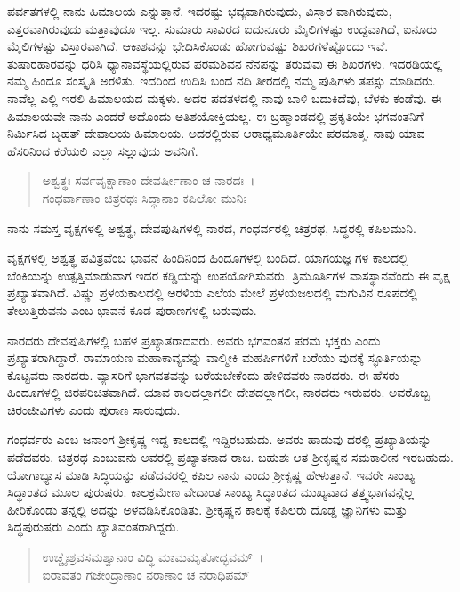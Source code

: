 ಪರ್ವತಗಳಲ್ಲಿ ನಾನು ಹಿಮಾಲಯ ಎನ್ನುತ್ತಾನೆ. ಇದರಷ್ಟು ಭವ್ಯವಾಗಿರುವುದು, ವಿಸ್ತಾರ ವಾಗಿರುವುದು, ಎತ್ತರವಾಗಿರುವುದು ಮತ್ತಾವುದೂ ಇಲ್ಲ. ಸುಮಾರು ಸಾವಿರದ ಐದುನೂರು ಮೈಲಿಗಳಷ್ಟು ಉದ್ದವಾಗಿದೆ, ಐನೂರು ಮೈಲಿಗಳಷ್ಟು ವಿಸ್ತಾರವಾಗಿದೆ. ಆಕಾಶವನ್ನು ಭೇದಿಸಿಕೊಂಡು ಹೋಗುವಷ್ಟು ಶಿಖರಗಳೆಷ್ಟೊಂದು ಇವೆ. ತುಷಾರಹಾರವನ್ನು ಧರಿಸಿ ಧ್ಯಾನಾವಸ್ಥೆಯಲ್ಲಿರುವ ಪರಮಶಿವನ ನೆನಪನ್ನು ತರುವುವು ಈ ಶಿಖರಗಳು. ಇದರಡಿಯಲ್ಲಿ ನಮ್ಮ ಹಿಂದೂ ಸಂಸ್ಕೃತಿ ಅರಳಿತು. ಇದರಿಂದ ಉದಿಸಿ ಬಂದ ನದಿ ತೀರದಲ್ಲಿ ನಮ್ಮ ಪುಷಿಗಳು ತಪಸ್ಸು ಮಾಡಿದರು. ನಾವೆಲ್ಲ ಎಲ್ಲಿ ಇರಲಿ ಹಿಮಾಲಯದ ಮಕ್ಕಳು. ಅದರ ಪದತಳದಲ್ಲಿ ನಾವು ಬಾಳಿ ಬದುಕಿದೆವು, ಬೆಳಕು ಕಂಡೆವು. ಈ ಹಿಮಾಲಯವೇ ನಾನು ಎಂದರೆ ಅದೊಂದು ಅತಿಶಯೋಕ್ತಿಯಲ್ಲ. ಈ ಬ್ರಹ್ಮಾಂಡದಲ್ಲಿ ಪ್ರಕೃತಿಯೇ ಭಗವಂತನಿಗೆ ನಿರ್ಮಿಸಿದ ಬೃಹತ್ ದೇವಾಲಯ ಹಿಮಾಲಯ. ಅದರಲ್ಲಿರುವ ಆರಾಧ್ಯಮೂರ್ತಿಯೇ ಪರಮಾತ್ಮ. ನಾವು ಯಾವ ಹೆಸರಿನಿಂದ ಕರೆಯಲಿ ಎಲ್ಲಾ ಸಲ್ಲುವುದು ಅವನಿಗೆ.

\begin{verse}
ಅಶ್ವತ್ಥಃ ಸರ್ವವೃಕ್ಷಾಣಾಂ ದೇವರ್ಷೀಣಾಂ ಚ ನಾರದಃ~।\\ಗಂಧರ್ವಾಣಾಂ ಚಿತ್ರರಥಃ ಸಿದ್ಧಾನಾಂ ಕಪಿಲೋ ಮುನಿಃ 
\end{verse}

{\small ನಾನು ಸಮಸ್ತ ವೃಕ್ಷಗಳಲ್ಲಿ ಅಶ್ವತ್ಥ, ದೇವಪುಷಿಗಳಲ್ಲಿ ನಾರದ, ಗಂಧರ್ವರಲ್ಲಿ ಚಿತ್ರರಥ, ಸಿದ್ಧರಲ್ಲಿ ಕಪಿಲಮುನಿ.}

ವೃಕ್ಷಗಳಲ್ಲಿ ಅಶ್ವತ್ಥ ಪವಿತ್ರವೆಂಬ ಭಾವನೆ ಹಿಂದಿನಿಂದ ಹಿಂದೂಗಳಲ್ಲಿ ಬಂದಿದೆ. ಯಾಗಯಜ್ಞ ಗಳ ಕಾಲದಲ್ಲಿ ಬೆಂಕಿಯನ್ನು ಉತ್ಪತ್ತಿಮಾಡುವಾಗ ಇದರ ಕಡ್ಡಿಯನ್ನು ಉಪಯೋಗಿಸುವರು. ತ್ರಿಮೂರ್ತಿಗಳ ವಾಸಸ್ಥಾನವೆಂದು ಈ ವೃಕ್ಷ ಪ್ರಖ್ಯಾತವಾಗಿದೆ. ವಿಷ್ಣು ಪ್ರಳಯಕಾಲದಲ್ಲಿ ಅರಳಿಯ ಎಲೆಯ ಮೇಲೆ ಪ್ರಳಯಜಲದಲ್ಲಿ ಮಗುವಿನ ರೂಪದಲ್ಲಿ ತೇಲುತ್ತಿರುವನು ಎಂಬ ಭಾವನೆ ಕೂಡ ಪುರಾಣಗಳಲ್ಲಿ ಬರುವುದು.

ನಾರದರು ದೇವಪುಷಿಗಳಲ್ಲಿ ಬಹಳ ಪ್ರಖ್ಯಾತರಾದವರು. ಅವರು ಭಗವಂತನ ಪರಮ ಭಕ್ತರು ಎಂದು ಪ್ರಖ್ಯಾತರಾಗಿದ್ದಾರೆ. ರಾಮಾಯಣ ಮಹಾಕಾವ್ಯವನ್ನು ವಾಲ್ಮೀಕಿ ಮಹರ್ಷಿಗಳಿಗೆ ಬರೆಯು ವುದಕ್ಕೆ ಸ್ಫೂರ್ತಿಯನ್ನು ಕೊಟ್ಟವರು ನಾರದರು. ವ್ಯಾಸರಿಗೆ ಭಾಗವತವನ್ನು ಬರೆಯಬೇಕೆಂದು ಹೇಳಿದವರು ನಾರದರು. ಈ ಹೆಸರು ಹಿಂದೂಗಳಲ್ಲಿ ಚಿರಪರಿಚಿತವಾಗಿದೆ. ಯಾವ ಕಾಲದಲ್ಲಾಗಲೀ ದೇಶದಲ್ಲಾಗಲೀ, ನಾರದರು ಇರುವರು. ಅವರೊಬ್ಬ ಚಿರಂಜೀವಿಗಳು ಎಂದು ಪುರಾಣ ಸಾರುವುದು.

ಗಂಧರ್ವರು ಎಂಬ ಜನಾಂಗ ಶ‍್ರೀಕೃಷ್ಣ ಇದ್ದ ಕಾಲದಲ್ಲಿ ಇದ್ದಿರಬಹುದು. ಅವರು ಹಾಡುವು ದರಲ್ಲಿ ಪ್ರಖ್ಯಾತಿಯನ್ನು ಪಡೆದವರು. ಚಿತ್ರರಥ ಎಂಬುವನು ಅವರಲ್ಲಿ ಪ್ರಖ್ಯಾತನಾದ ರಾಜ. ಬಹುಶಃ ಆತ ಶ‍್ರೀಕೃಷ್ಣನ ಸಮಕಾಲೀನ ಇರಬಹುದು. ಯೋಗಾಭ್ಯಾಸ ಮಾಡಿ ಸಿದ್ಧಿಯನ್ನು ಪಡೆದವರಲ್ಲಿ ಕಪಿಲ ನಾನು ಎಂದು ಶ‍್ರೀಕೃಷ್ಣ ಹೇಳುತ್ತಾನೆ. ಇವರೇ ಸಾಂಖ್ಯ ಸಿದ್ಧಾಂತದ ಮೂಲ ಪುರುಷರು. ಕಾಲಕ್ರಮೇಣ ವೇದಾಂತ ಸಾಂಖ್ಯ ಸಿದ್ಧಾಂತದ ಮುಖ್ಯವಾದ ತತ್ತ್ವಭಾಗವನ್ನೆಲ್ಲ ಹೀರಿಕೊಂಡು ತನ್ನಲ್ಲಿ ಅದನ್ನು ಅಳವಡಿಸಿಕೊಂಡಿತು. ಶ‍್ರೀಕೃಷ್ಣನ ಕಾಲಕ್ಕೆ ಕಪಿಲರು ದೊಡ್ಡ ಜ್ಞಾನಿಗಳು ಮತ್ತು ಸಿದ್ಧಪುರುಷರು ಎಂದು ಖ್ಯಾತಿವಂತರಾಗಿದ್ದರು.

\begin{verse}
ಉಚ್ಚೈಃಶ್ರವಸಮಶ್ವಾನಾಂ ವಿದ್ಧಿ ಮಾಮಮೃತೋದ್ಭವಮ್~।\\ಐರಾವತಂ ಗಜೇಂದ್ರಾಣಾಂ ನರಾಣಾಂ ಚ ನರಾಧಿಪಮ್ 
\end{verse}

